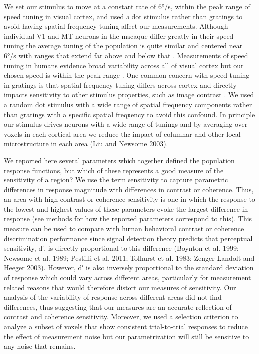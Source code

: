 \documentclass{report}
\begin{document}
We set our stimulus to move at a constant rate of 6°/s, within the peak range of speed tuning in visual cortex, and used a dot stimulus rather than gratings to avoid having spatial frequency tuning affect our measurements. Although individual V1 and MT neurons in the macaque differ greatly in their speed tuning the average tuning of the population is quite similar and centered near 6°/s with ranges that extend far above and below that \citep{Priebe2006-uy}. Measurements of speed tuning in humans evidence broad variability across all of visual cortex but our chosen speed is within the peak range \citep{Singh2000-wr,Hammett2013-fg}. One common concern with speed tuning in gratings is that spatial frequency tuning differs across cortex and directly impacts sensitivity to other stimulus properties, such as image contrast \citep{Priebe2003-ua,Priebe2006-uy}. We used a random dot stimulus with a wide range of spatial frequency components rather than gratings with a specific spatial frequency to avoid this confound. In principle our stimulus drives neurons with a wide range of tunings and by averaging over voxels in each cortical area we reduce the impact of columnar and other local microstructure in each area \citep{Sun2007-cf}(Liu and Newsome 2003).

We reported here several parameters which together defined the population response functions, but which of these represents a good measure of the sensitivity of a region? We use the term sensitivity to capture parametric differences in response magnitude with differences in contrast or coherence. Thus, an area with high contrast or coherence sensitivity is one in which the response to the lowest and highest values of these parameters evoke the largest difference in response (see methods for how the reported parameters correspond to this). This measure can be used to compare with human behavioral contrast or coherence discrimination performance since signal detection theory predicts that perceptual sensitivity, d′, is directly proportional to this difference (Boynton et al. 1999; Newsome et al. 1989; Pestilli et al. 2011; Tolhurst et al. 1983; Zenger-Landolt and Heeger 2003). However, d′ is also inversely proportional to the standard deviation of response which could vary across different areas, particularly for measurement related reasons that would therefore distort our measures of sensitivity. Our analysis of the variability of response across different areas did not find differences, thus suggesting that our measures are an accurate reflection of contrast and coherence sensitivity. Moreover, we used a selection criterion to analyze a subset of voxels that show consistent trial-to-trial responses to reduce the effect of measurement noise but our parametrization will still be sensitive to any noise that remains.
\end{document}

